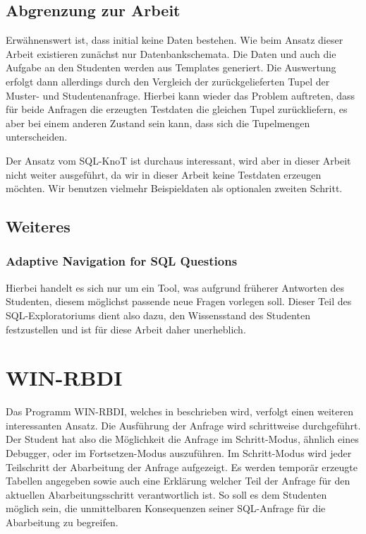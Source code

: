 \subsection*{Abgrenzung zur Arbeit}

Erwähnenswert ist, dass initial keine Daten bestehen. Wie beim Ansatz dieser Arbeit existieren zunächst nur Datenbankschemata. Die Daten und auch die Aufgabe an den Studenten werden aus Templates generiert. Die Auswertung erfolgt dann allerdings durch den Vergleich der zurückgelieferten Tupel der Muster- und Studentenanfrage. Hierbei kann wieder das Problem auftreten, dass für beide Anfragen die erzeugten Testdaten die gleichen Tupel zurückliefern, es aber bei einem anderen Zustand sein kann, dass sich die Tupelmengen unterscheiden. 

Der Ansatz vom SQL-KnoT ist durchaus interessant, wird aber in dieser Arbeit nicht weiter ausgeführt, da wir in dieser Arbeit keine Testdaten erzeugen möchten. Wir benutzen vielmehr Beispieldaten als optionalen zweiten Schritt.

\subsection{Weiteres}

\subsubsection{Adaptive Navigation for SQL Questions}

Hierbei handelt es sich nur um ein Tool, was aufgrund früherer Antworten des Studenten, diesem möglichst passende neue Fragen vorlegen soll. Dieser Teil des SQL-Exploratoriums dient also dazu, den Wissensstand des Studenten festzustellen und ist für diese Arbeit daher unerheblich. 

\section{WIN-RBDI}

Das Programm WIN-RBDI, welches in \cite{winrbdi1} beschrieben wird, verfolgt einen weiteren interessanten Ansatz.  Die Ausführung der Anfrage wird schrittweise durchgeführt. Der Student hat also die Möglichkeit die Anfrage im Schritt-Modus, ähnlich eines Debugger, oder im Fortsetzen-Modus auszuführen. Im Schritt-Modus wird jeder Teilschritt der Abarbeitung der Anfrage aufgezeigt. Es werden temporär erzeugte Tabellen angegeben sowie auch eine Erklärung welcher Teil der Anfrage für den aktuellen Abarbeitungsschritt verantwortlich ist. So soll es dem Studenten möglich sein, die unmittelbaren Konsequenzen seiner SQL-Anfrage für die Abarbeitung zu begreifen. 

